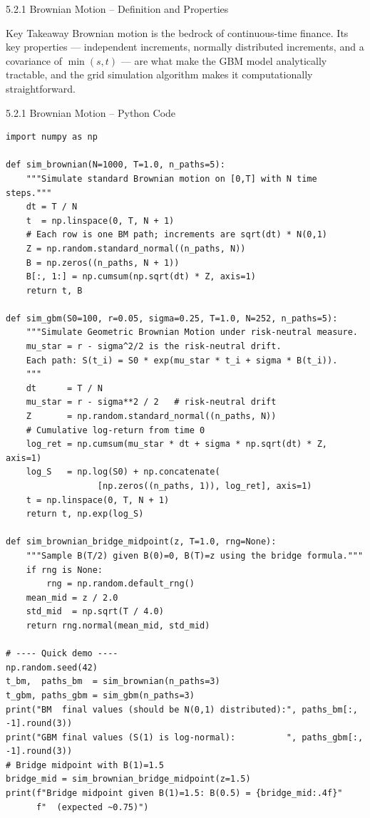 \documentclass[aspectratio=169,10pt]{beamer}
\begin{document}
\begin{frame}[allowframebreaks]{5.2.1 Brownian Motion -- Definition and Properties}
\begin{alertblock}{Key Takeaway}
  Brownian motion is the bedrock of continuous-time finance.  Its key properties
  --- independent increments, normally distributed increments, and a covariance
  of $\min(s,t)$ --- are what make the GBM model analytically tractable, and the
  grid simulation algorithm makes it computationally straightforward.
\end{alertblock}

\end{frame}

\begin{frame}[fragile]{5.2.1 Brownian Motion -- Python Code}
\begin{lstlisting}[style=python]
import numpy as np

def sim_brownian(N=1000, T=1.0, n_paths=5):
    """Simulate standard Brownian motion on [0,T] with N time steps."""
    dt = T / N
    t  = np.linspace(0, T, N + 1)
    # Each row is one BM path; increments are sqrt(dt) * N(0,1)
    Z = np.random.standard_normal((n_paths, N))
    B = np.zeros((n_paths, N + 1))
    B[:, 1:] = np.cumsum(np.sqrt(dt) * Z, axis=1)
    return t, B

def sim_gbm(S0=100, r=0.05, sigma=0.25, T=1.0, N=252, n_paths=5):
    """Simulate Geometric Brownian Motion under risk-neutral measure.
    mu_star = r - sigma^2/2 is the risk-neutral drift.
    Each path: S(t_i) = S0 * exp(mu_star * t_i + sigma * B(t_i)).
    """
    dt      = T / N
    mu_star = r - sigma**2 / 2   # risk-neutral drift
    Z       = np.random.standard_normal((n_paths, N))
    # Cumulative log-return from time 0
    log_ret = np.cumsum(mu_star * dt + sigma * np.sqrt(dt) * Z, axis=1)
    log_S   = np.log(S0) + np.concatenate(
                  [np.zeros((n_paths, 1)), log_ret], axis=1)
    t = np.linspace(0, T, N + 1)
    return t, np.exp(log_S)

def sim_brownian_bridge_midpoint(z, T=1.0, rng=None):
    """Sample B(T/2) given B(0)=0, B(T)=z using the bridge formula."""
    if rng is None:
        rng = np.random.default_rng()
    mean_mid = z / 2.0
    std_mid  = np.sqrt(T / 4.0)
    return rng.normal(mean_mid, std_mid)

# ---- Quick demo ----
np.random.seed(42)
t_bm,  paths_bm  = sim_brownian(n_paths=3)
t_gbm, paths_gbm = sim_gbm(n_paths=3)
print("BM  final values (should be N(0,1) distributed):", paths_bm[:, -1].round(3))
print("GBM final values (S(1) is log-normal):          ", paths_gbm[:, -1].round(3))
# Bridge midpoint with B(1)=1.5
bridge_mid = sim_brownian_bridge_midpoint(z=1.5)
print(f"Bridge midpoint given B(1)=1.5: B(0.5) = {bridge_mid:.4f}"
      f"  (expected ~0.75)")
\end{lstlisting}
\end{frame}
\end{document}
